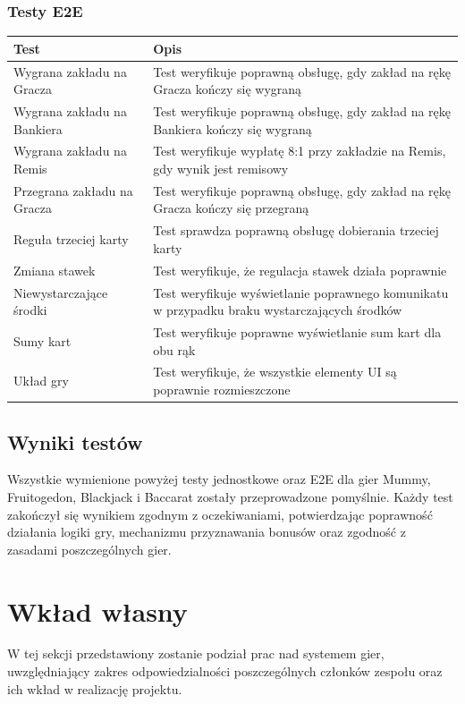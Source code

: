 \documentclass[a4paper,12pt]{article}
\begin{document}
\subsubsection*{Testy E2E}

\begin{tabularx}{\textwidth}{lX}
\toprule
\textbf{Test} & \textbf{Opis} \\
\midrule
Wygrana zakładu na Gracza & Test weryfikuje poprawną obsługę, gdy zakład na rękę Gracza kończy się wygraną \\
Wygrana zakładu na Bankiera & Test weryfikuje poprawną obsługę, gdy zakład na rękę Bankiera kończy się wygraną \\
Wygrana zakładu na Remis & Test weryfikuje wypłatę 8:1 przy zakładzie na Remis, gdy wynik jest remisowy \\
Przegrana zakładu na Gracza & Test weryfikuje poprawną obsługę, gdy zakład na rękę Gracza kończy się przegraną \\
Reguła trzeciej karty & Test sprawdza poprawną obsługę dobierania trzeciej karty \\
Zmiana stawek & Test weryfikuje, że regulacja stawek działa poprawnie \\
Niewystarczające środki & Test weryfikuje wyświetlanie poprawnego komunikatu w przypadku braku wystarczających środków \\
Sumy kart & Test weryfikuje poprawne wyświetlanie sum kart dla obu rąk \\
Układ gry & Test weryfikuje, że wszystkie elementy UI są poprawnie rozmieszczone \\
\bottomrule
\end{tabularx}

 
\subsection{Wyniki testów}

Wszystkie wymienione powyżej testy jednostkowe oraz E2E dla gier Mummy, Fruitogedon, Blackjack i Baccarat zostały przeprowadzone pomyślnie. Każdy test zakończył się wynikiem zgodnym z oczekiwaniami, potwierdzając poprawność działania logiki gry, mechanizmu przyznawania bonusów oraz zgodność z zasadami poszczególnych gier.

\newpage
\section{Wkład własny}

W tej sekcji przedstawiony zostanie podział prac nad systemem gier, uwzględniający zakres odpowiedzialności poszczególnych członków zespołu oraz ich wkład w realizację projektu.
\end{document}
